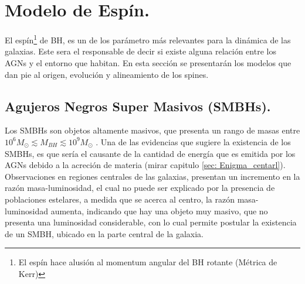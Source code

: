 \begin{savequote}[50mm]
\end{savequote}




\chapter{Modelo de Espín.}
\label{cha:Modelo de Spin}

El espín\footnote{El espín hace alusión al momentum angular del BH  rotante (Métrica de Kerr)} de BH, es un de los parámetro más relevantes para la dinámica de las galaxias. Este sera el responsable de decir si existe alguna relación entre los AGNs y el entorno que habitan. En esta sección se presentarán los modelos que dan pie al origen, evolución y  alineamiento de los spines.

\section{Agujeros Negros Super Masivos (SMBHs).}
\label{sec: SMBH}
Los SMBHs son objetos altamente masivos, que presenta un rango de masas entre $10^6M_{\odot}\lesssim M_{BH} \lesssim 10^{9}M_{\odot}$ \cite{mo2010}. Una de las evidencias que sugiere la existencia de los SMBHs, es que sería el causante de la cantidad de energía que es emitida por los AGNs debido a la acreción de materia (mirar capitulo \ref{sec: Enigma_centarl}). Observaciones en regiones centrales de las galaxias, presentan un incremento en la razón masa-luminosidad, el cual no puede ser explicado por la presencia de poblaciones estelares, a medida que se acerca al centro, la razón masa-luminosidad aumenta, indicando que hay una objeto muy masivo, que no presenta una luminosidad considerable, con lo cual permite postular la existencia de un SMBH, ubicado en la parte central de la galaxia.  

